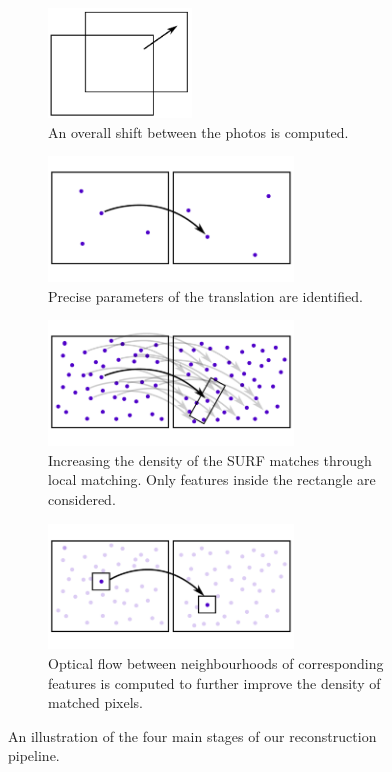 \vspace{0.5cm}
\begin{figure}[H]
\centering

\begin{subfigure}[b]{0.45\textwidth}
\centering
\includegraphics[width=3.8cm]{img/impl0.pdf}
\caption{An overall shift between the photos is computed.} \label{impl0}
\end{subfigure}
\hspace{0.5cm}
\begin{subfigure}[b]{0.45\textwidth}
\centering
\includegraphics[width=6.5cm]{img/impl1.pdf}
\caption{Precise parameters of the translation are identified.} \label{impl1}
\end{subfigure}
\begin{subfigure}[b]{0.45\textwidth}
\centering
\includegraphics[width=6.5cm]{img/impl2.pdf}
\caption{Increasing the density of the SURF matches through local matching. Only features inside the rectangle are considered.} \label{impl2}
\end{subfigure}
\hspace{0.5cm}
\begin{subfigure}[b]{0.45\textwidth}
\centering
\includegraphics[width=6.5cm]{img/impl3.pdf}
\caption{Optical flow between neighbourhoods of corresponding features is computed to further improve the density of matched pixels.} \label{impl3}
\end{subfigure}

\caption[]{An illustration of the four main stages of our reconstruction pipeline.} 
\label{fig:impl}
\end{figure}
\vspace{0.5cm}

